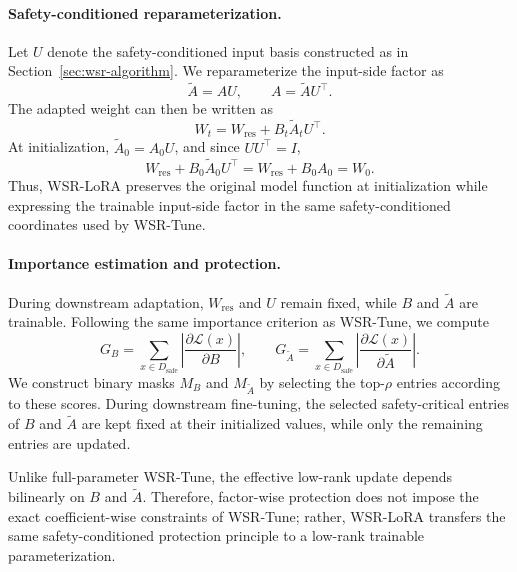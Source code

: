 \documentclass{article}
\begin{document}
\paragraph{Safety-conditioned reparameterization.}
Let $U$ denote the safety-conditioned input basis constructed as in
Section~\ref{sec:wsr-algorithm}. We reparameterize the input-side factor as
\begin{equation}
    \widetilde A=AU,
    \qquad
    A=\widetilde A U^\top.
\end{equation}
The adapted weight can then be written as
\begin{equation}
    W_t
    =
    W_{\mathrm{res}}
    +
    B_t\widetilde A_tU^\top.
\end{equation}
At initialization, $\widetilde A_0=A_0U$, and since $UU^\top=I$,
\begin{equation}
    W_{\mathrm{res}}
    +
    B_0\widetilde A_0U^\top
    =
    W_{\mathrm{res}}+B_0A_0
    =
    W_0.
\end{equation}
Thus, WSR-LoRA preserves the original model function at initialization while expressing the trainable input-side factor in the same safety-conditioned coordinates used by WSR-Tune.

\paragraph{Importance estimation and protection.}
During downstream adaptation, $W_{\mathrm{res}}$ and $U$ remain fixed, while $B$ and $\widetilde A$ are trainable. Following the same importance criterion as WSR-Tune, we compute
\begin{equation}
    G_B
    =
    \sum_{x\in D_{\mathrm{safe}}}
    \left|
    \frac{\partial \mathcal L(x)}{\partial B}
    \right|,
    \qquad
    G_{\widetilde A}
    =
    \sum_{x\in D_{\mathrm{safe}}}
    \left|
    \frac{\partial \mathcal L(x)}{\partial \widetilde A}
    \right|.
\end{equation}
We construct binary masks $M_B$ and $M_{\widetilde A}$ by selecting the top-$\rho$ entries according to these scores. During downstream fine-tuning, the selected safety-critical entries of $B$ and $\widetilde A$ are kept fixed at their initialized values, while only the remaining entries are updated.

Unlike full-parameter WSR-Tune, the effective low-rank update depends bilinearly on $B$ and $\widetilde A$. Therefore, factor-wise protection does not impose the exact coefficient-wise constraints of WSR-Tune; rather, WSR-LoRA transfers the same safety-conditioned protection principle to a low-rank trainable parameterization.
\end{document}

